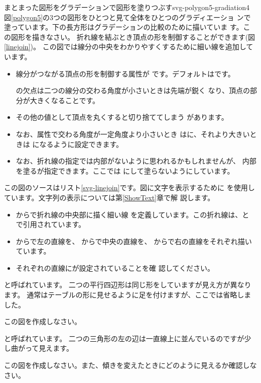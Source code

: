 {まとまった図形をグラデーションで図形を塗りつぶす}{svg-polygon5-gradiation4}
{図\ref{polygon5}の3つの図形をひとつと見て全体をひとつのグラディエーショ
ンで塗っています。下の長方形はグラデーションの比較のために描いていま
す。この図形を描きなさい。}
\ifSeminor
\else
\newpage
\fi
折れ線を結ぶとき頂点の形を制御することができます(図\ref{linejoin})。
この図では線分の中央をわかりやすくするために細い線を追加しています。

\begin{itemize}
 \item 線分がつながる頂点の形を制御する属性が
       です。デフォルトはです。

の欠点は二つの線分の交わる角度が小さいときは先端が鋭く
       なり、頂点の部分が大きくなることです。
 \item その他の値として頂点を丸くすると切り捨ててしまう
       があります。
 \item なお、属性で交わる角度が一定角度より小さいとき
       はに、それより大きいときは
       になるように設定できます。
 \item なお、折れ線の指定では内部がないように思われるかもしれませんが、
       内部を塗るが指定できます。ここでは
       にして塗らないようにしています。
\end{itemize}
この図のソースはリスト\ref{svg-linejoin}です。図に文字を表示するために
を使用しています。文字列の表示については第\ref{ShowText}章で解
説します。
\begin{itemize}
 \item {}からで折れ線の中央部に描く細い線
       を定義しています。この折れ線は、と
       で引用されています。
 \item {}からで左の直線を、
       からで中央の直線を、
       からで右の直線をそれぞれ描いています。
 \item それぞれの直線にが設定されていることを確
       認してください。
\end{itemize}

{と呼ばれています。
二つの平行四辺形は同じ形をしていますが見え方が異なります。
通常はテーブルの形に見せるように足を付けますが、ここでは省略しました。
\par
この図を作成しなさい。}

{と呼ばれています。
二つの三角形の左の辺は一直線上に並んでいるのですが少し曲がって見えます。
\par
この図を作成しなさい。また、傾きを変えたときにどのように見えるか確認しな
 さい。}
